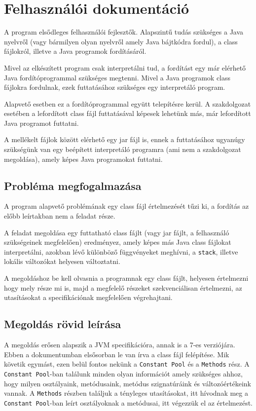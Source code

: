 \chapter{Felhasználói dokumentáció}
\label{ch:user}

A program elsődleges felhasználói fejlesztők. Alapszintű tudás szükséges a Java nyelvről (vagy bármilyen olyan nyelvről amely Java bájtkódra fordul), a class fájlokról, illetve a Java programok fordításáról.

Mivel az elkészített program csak interpretálni tud, a fordítást egy már elérhető Java fordítóprogrammal szükséges megtenni. Mivel a Java programok class fájlokra fordulnak, ezek futtatásához szükséges egy interpretáló program.

Alapvető esetben ez a fordítóprogrammal együtt telepítésre kerül. A szakdolgozat esetében a lefordított class fájl futtatásával képesek lehetünk más, már lefordított Java programot futtatni.

A mellékelt fájlok között elérhető egy jar fájl is, ennek a futtatásához ugyanúgy szükségünk van egy beépített interpretáló programra (ami nem a szakdolgozat megoldása), amely képes Java programokat futtatni.

\section{Probléma megfogalmazása}

A program alapvető problémának egy class fájl értelmezését tűzi ki, a fordítás az előbb leírtakban nem a feladat része. 

A feladat megoldása egy futtatható class fájlt (vagy jar fájlt, a felhasználó szükségeinek megfelelően) eredményez, amely képes más Java class fájlokat interpretálni, azokban lévő különböző függvényeket meghívni, a \lstinline{stack}, illetve lokális változókat helyesen változtatni.

A megoldáshoz be kell olvasnia a programnak egy class fájlt, helyesen értelmezni hogy mely része mi is, majd a megfelelő részeket szekvenciálisan értelmezni, az utasításokat a specifikációnak megfelelően végrehajtani. 

\section{Megoldás rövid leírása}

A megoldás erősen alapszik a JVM specifikációra\cite{jvm_specification}, annak is a 7-es verziójára. Ebben a dokumentumban elsősorban le van írva a class fájl felépítése. Mik követik egymást, ezen belül fontos nekünk a \lstinline{Constant Pool} és a \lstinline{Methods} rész. A \lstinline{Constant Pool}-ban találunk minden olyan információt amely szükséges ahhoz, hogy milyen osztályaink, metódusaink, metódus szignatúráink és változóértékeink vannak. A \lstinline{Methods} részben találjuk a tényleges utasításokat, itt hívodnak meg a \lstinline{Constant Pool}-ban leírt osztályoknak a metódusai, itt végezzük el az értelmezést.

